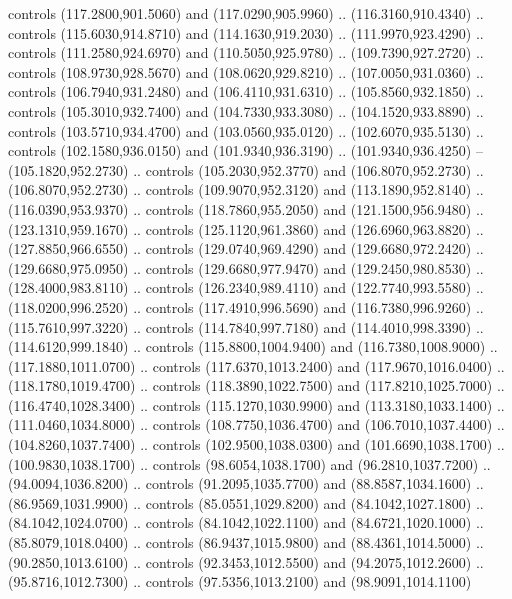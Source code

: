 {{\begin{scope}[shift={(-17.2pt,228.5pt)},y=-0.80pt,x=0.80pt,scale=0.3,transform shape]
        controls (117.2800,901.5060) and (117.0290,905.9960) .. (116.3160,910.4340) ..
        controls (115.6030,914.8710) and (114.1630,919.2030) .. (111.9970,923.4290) ..
        controls (111.2580,924.6970) and (110.5050,925.9780) .. (109.7390,927.2720) ..
        controls (108.9730,928.5670) and (108.0620,929.8210) .. (107.0050,931.0360) ..
        controls (106.7940,931.2480) and (106.4110,931.6310) .. (105.8560,932.1850) ..
        controls (105.3010,932.7400) and (104.7330,933.3080) .. (104.1520,933.8890) ..
        controls (103.5710,934.4700) and (103.0560,935.0120) .. (102.6070,935.5130) ..
        controls (102.1580,936.0150) and (101.9340,936.3190) .. (101.9340,936.4250) --
        (105.1820,952.2730) .. controls (105.2030,952.3770) and (106.8070,952.2730) ..
        (106.8070,952.2730) .. controls (109.9070,952.3120) and (113.1890,952.8140) ..
        (116.0390,953.9370) .. controls (118.7860,955.2050) and (121.1500,956.9480) ..
        (123.1310,959.1670) .. controls (125.1120,961.3860) and (126.6960,963.8820) ..
        (127.8850,966.6550) .. controls (129.0740,969.4290) and (129.6680,972.2420) ..
        (129.6680,975.0950) .. controls (129.6680,977.9470) and (129.2450,980.8530) ..
        (128.4000,983.8110) .. controls (126.2340,989.4110) and (122.7740,993.5580) ..
        (118.0200,996.2520) .. controls (117.4910,996.5690) and (116.7380,996.9260) ..
        (115.7610,997.3220) .. controls (114.7840,997.7180) and (114.4010,998.3390) ..
        (114.6120,999.1840) .. controls (115.8800,1004.9400) and (116.7380,1008.9000)
        .. (117.1880,1011.0700) .. controls (117.6370,1013.2400) and
        (117.9670,1016.0400) .. (118.1780,1019.4700) .. controls (118.3890,1022.7500)
        and (117.8210,1025.7000) .. (116.4740,1028.3400) .. controls
        (115.1270,1030.9900) and (113.3180,1033.1400) .. (111.0460,1034.8000) ..
        controls (108.7750,1036.4700) and (106.7010,1037.4400) .. (104.8260,1037.7400)
        .. controls (102.9500,1038.0300) and (101.6690,1038.1700) ..
        (100.9830,1038.1700) .. controls (98.6054,1038.1700) and (96.2810,1037.7200)
        .. (94.0094,1036.8200) .. controls (91.2095,1035.7700) and (88.8587,1034.1600)
        .. (86.9569,1031.9900) .. controls (85.0551,1029.8200) and (84.1042,1027.1800)
        .. (84.1042,1024.0700) .. controls (84.1042,1022.1100) and (84.6721,1020.1000)
        .. (85.8079,1018.0400) .. controls (86.9437,1015.9800) and (88.4361,1014.5000)
        .. (90.2850,1013.6100) .. controls (92.3453,1012.5500) and (94.2075,1012.2600)
        .. (95.8716,1012.7300) .. controls (97.5356,1013.2100) and (98.9091,1014.1100)

\end{scope}}}
